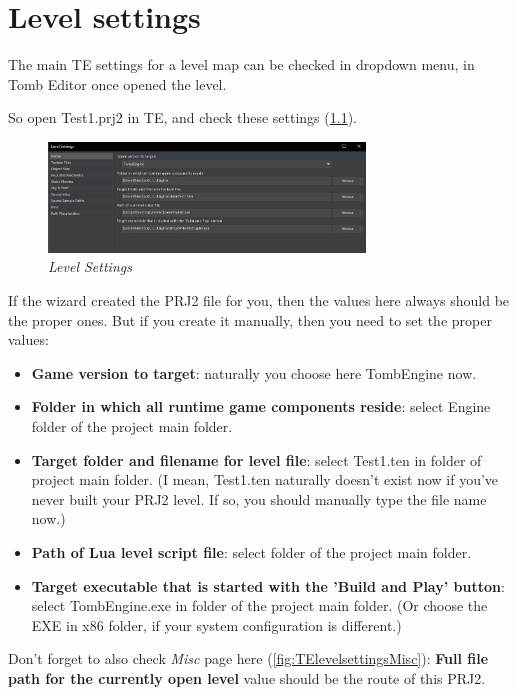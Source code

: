 \chapter{Level settings}

The main TE settings for a level map can be checked in dropdown  menu, in Tomb Editor once opened the level.

So open Test1.prj2 in TE, and check these settings (\ref{fig:TElevelsettings}).

\begin{figure}
    \centering
     \includegraphics[width=0.75\textwidth]{screenshots/23.jpg}
     \caption{\emph{Level Settings}}
     \label{fig:TElevelsettings}
\end{figure}

If the wizard created the PRJ2 file for you, then the values here always should be the proper ones. But if you create it manually, then you need to set the proper values:
\begin{itemize}
    \item \textbf{Game version to target}: naturally you choose here TombEngine now.
    \item \textbf{Folder in which all runtime game components reside}: select Engine folder of the project main folder.
    \item \textbf{Target folder and filename for level file}: select Test1.ten in  folder of project main folder. (I mean, Test1.ten naturally doesn't exist now if you've never built your PRJ2 level. If so, you should manually type the file name now.)
    \item \textbf{Path of Lua level script file}: select  folder of the project main folder.
    \item \textbf{Target executable that is started with the 'Build and Play' button}: select TombEngine.exe in  folder of the project main folder. (Or choose the EXE in x86 folder, if your system configuration is different.)
\end{itemize}

 Don't forget to also check \emph{Misc} page here (\ref{fig:TElevelsettingsMisc}): \textbf{Full file path for the currently open level} value should be the route of this PRJ2.

